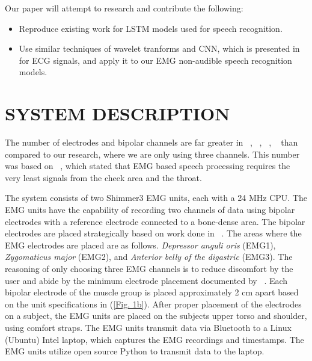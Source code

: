 \documentclass{article}
\begin{document}
Our paper will attempt to research and contribute the following:
\begin{itemize}
  \item Reproduce existing work for LSTM models used for speech recognition. 
  \item Use similar techniques of wavelet tranforms and CNN, which is presented in\cite{noauthor_classify_nodate} for ECG signals, and apply it to our EMG non-audible speech recognition models. 
\end{itemize}

\section{SYSTEM DESCRIPTION}
\label{sec:SYSTEM DESCRIPTION}

The number of electrodes and bipolar channels are far greater in ~\cite{kapur_alterego:_2018}, ~\cite{wand_pattern_2014}, ~\cite{janke_emg--speech:_2017}, ~\cite{maier-hein_session_2005} than compared to our research, where we are only using three channels. This number was based on ~\cite{maier-hein_session_2005}, which stated that EMG based speech processing requires the very least signals from the cheek area and the throat. 

The system consists of two Shimmer3 EMG units, each with a 24 MHz CPU. The EMG units have the capability of recording two channels of data using  bipolar electrodes with a reference electrode connected to a bone-dense area. The bipolar electrodes are placed strategically based on work done in ~\cite{lopez-larraz_syllable-based_2010}. The areas where the EMG electrodes are placed are as follows. \textit{Depressor anguli oris} (EMG1), \textit{Zygomaticus major} (EMG2), and \textit{Anterior belly of the digastric} (EMG3). The reasoning of only choosing three EMG channels is to reduce discomfort by the user and abide by the minimum electrode placement documented by ~\cite{maier-hein_session_2005}. Each bipolar electrode of the muscle group is placed approximately 2 cm apart based on the unit specifications in (\figurename \ref{Fig. 1b}). After proper placement of the electrodes on a subject, the EMG units are placed on the subjects upper torso and shoulder, using comfort straps. The EMG units transmit data via Bluetooth to a Linux (Ubuntu) Intel laptop, which captures the EMG recordings and timestamps. The EMG units utilize open source Python to transmit data to the laptop.
\end{document}
